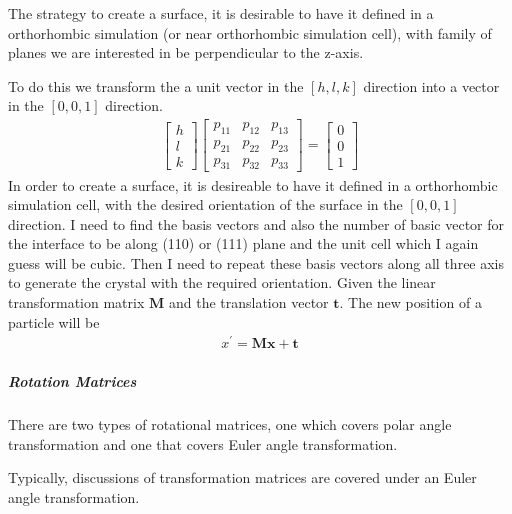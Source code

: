 \documentclass[letterpaper,10pt,english]{sphinxmanual}
\begin{document}
The strategy to create a surface, it is desirable to have it defined in a orthorhombic simulation (or near orthorhombic simulation cell), with family of planes we are interested in be perpendicular to the z-axis.

To do this we transform the a unit vector in the \([h,l,k]\) direction into a vector in the \([0,0,1]\) direction.
\begin{equation*}
\begin{split}\begin{bmatrix} h \\ l \\ k \end{bmatrix}
\begin{bmatrix} p_{11} & p_{12} & p_{13} \\ p_{21} & p_{22} & p_{23} \\ p_{31} & p_{32} & p_{33} \end{bmatrix}
=
\begin{bmatrix} 0 \\ 0 \\ 1  \end{bmatrix}\end{split}
\end{equation*}
In order to create a surface, it is desireable to have it defined in a orthorhombic simulation cell, with the desired orientation of the surface in the \([0,0,1]\) direction.  I need to find the basis vectors and also the number of basic vector for the interface to be along (110) or (111) plane and the unit cell which I again guess will be cubic. Then I need to repeat these basis vectors along all three axis to generate the crystal with the required orientation.  Given the linear transformation matrix \(\mathbf{M}\) and the translation vector \(\mathbf{t}\).  The new position of a particle will be
\begin{equation*}
\begin{split}x^\prime = \mathbf{M} \mathbf{x} + \mathbf{t}\end{split}
\end{equation*}

\subparagraph{Rotation Matrices}
\label{\detokenize{calc_material_properties/calc_surface_energy:rotation-matrices}}
There are two types of rotational matrices, one which covers polar angle transformation and one that covers Euler angle transformation.

Typically, discussions of transformation matrices are covered under an Euler angle transformation.
\end{document}
